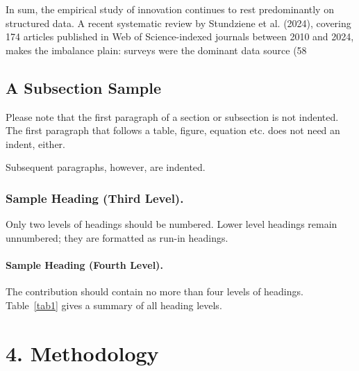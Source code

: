 \documentclass[runningheads]{llncs}
\begin{document}
In sum, the empirical study of innovation continues to rest predominantly on structured data. A recent systematic review by Stundziene et al. (2024), covering 174 articles published in Web of Science-indexed journals between 2010 and 2024, makes the imbalance plain: surveys were the dominant data source (58%


\subsection{A Subsection Sample}
Please note that the first paragraph of a section or subsection is
not indented. The first paragraph that follows a table, figure,
equation etc. does not need an indent, either.

Subsequent paragraphs, however, are indented.

\subsubsection{Sample Heading (Third Level).}
Only two levels of headings should be numbered. Lower level headings
remain unnumbered; they are formatted as run-in headings.

\paragraph{Sample Heading (Fourth Level).}
The contribution should contain no more than four levels of
headings. Table~\ref{tab1} gives a summary of all heading levels.


\section{4. Methodology}
\end{document}
